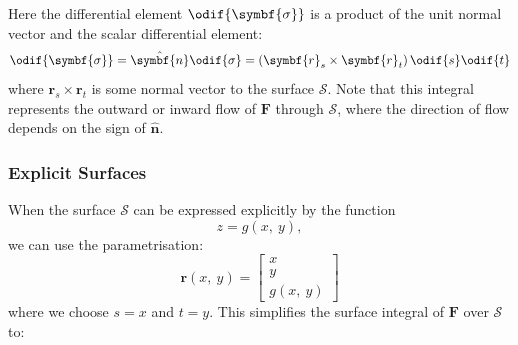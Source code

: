 \documentclass{article}
\begin{document}
Here the differential element \(\odif{\symbf{\sigma}}\) is a product of
the unit normal vector and the scalar differential element:
\begin{equation*}
    \odif{\symbf{\sigma}} = \hat{\symbf{n}} \odif{\sigma} = \left( \symbf{r}_s \times \symbf{r}_t \right) \odif{s} \odif{t}
\end{equation*}
where \(\symbf{r}_s \times \symbf{r}_t\) is some normal vector to the
surface \(\mathscr{S}\).
Note that this integral represents the outward or inward flow of
\(\symbf{F}\) through \(\mathscr{S}\), where the direction of flow
depends on the sign of \(\symbf{\hat{n}}\).
\subsubsection{Explicit Surfaces}
When the surface \(\mathscr{S}\) can be expressed explicitly by the
function
\begin{equation*}
    z = g\left( x,\: y \right),
\end{equation*}
we can use the parametrisation:
\begin{equation*}
    \symbf{r}\left( x,\: y \right) =
    \begin{bmatrix}
        x \\
        y \\
        g\left( x,\: y \right)
    \end{bmatrix}
\end{equation*}
where we choose \(s = x\) and \(t = y\). This simplifies the surface
integral of \(\symbf{F}\) over \(\mathscr{S}\) to:
\end{document}
